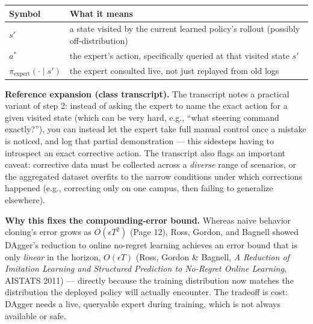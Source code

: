 \begin{center}
\begin{tabular}{@{}ll@{}}
\toprule
Symbol & What it means \\
\midrule
$s'$ & a state visited by the current learned policy's rollout (possibly off-distribution) \\
$a^*$ & the expert's action, specifically queried at that visited state $s'$ \\
$\pi_{\text{expert}}(\cdot\mid s')$ & the expert consulted live, not just replayed from old logs \\
\bottomrule
\end{tabular}
\end{center}

\textbf{Reference expansion (class transcript).} The transcript notes a practical variant of step 2: instead of asking the expert to name the exact action for a given visited state (which can be very hard, e.g., ``what steering command exactly?''), you can instead let the expert take full manual control once a mistake is noticed, and log that partial demonstration --- this sidesteps having to introspect an exact corrective action. The transcript also flags an important caveat: corrective data must be collected across a \emph{diverse} range of scenarios, or the aggregated dataset overfits to the narrow conditions under which corrections happened (e.g., correcting only on one campus, then failing to generalize elsewhere).

\textbf{Why this fixes the compounding-error bound.} Whereas naive behavior cloning's error grows as $O(\epsilon T^2)$ (Page 12), Ross, Gordon, and Bagnell showed DAgger's reduction to online no-regret learning achieves an error bound that is only \emph{linear} in the horizon, $O(\epsilon T)$ (Ross, Gordon \& Bagnell, \emph{A Reduction of Imitation Learning and Structured Prediction to No-Regret Online Learning}, AISTATS 2011) --- directly because the training distribution now matches the distribution the deployed policy will actually encounter. The tradeoff is cost: DAgger needs a live, queryable expert during training, which is not always available or safe.
